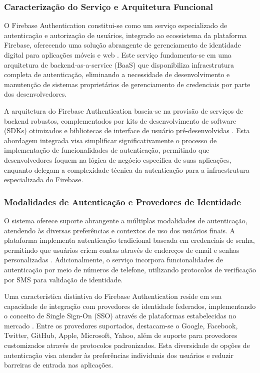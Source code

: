 \subsubsection{Caracterização do Serviço e Arquitetura Funcional}

O Firebase Authentication constitui-se como um serviço especializado de autenticação e autorização de usuários, integrado ao ecossistema da plataforma Firebase, oferecendo uma solução abrangente de gerenciamento de identidade digital para aplicações móveis e web \cite{google2023firebaseauth}. Este serviço fundamenta-se em uma arquitetura de backend-as-a-service (BaaS) que disponibiliza infraestrutura completa de autenticação, eliminando a necessidade de desenvolvimento e manutenção de sistemas proprietários de gerenciamento de credenciais por parte dos desenvolvedores.

A arquitetura do Firebase Authentication baseia-se na provisão de serviços de backend robustos, complementados por kits de desenvolvimento de software (SDKs) otimizados e bibliotecas de interface de usuário pré-desenvolvidas \cite{firebase2023sdk}. Esta abordagem integrada visa simplificar significativamente o processo de implementação de funcionalidades de autenticação, permitindo que desenvolvedores foquem na lógica de negócio específica de suas aplicações, enquanto delegam a complexidade técnica da autenticação para a infraestrutura especializada do Firebase.

\subsubsection{Modalidades de Autenticação e Provedores de Identidade}

O sistema oferece suporte abrangente a múltiplas modalidades de autenticação, atendendo às diversas preferências e contextos de uso dos usuários finais. A plataforma implementa autenticação tradicional baseada em credenciais de senha, permitindo que usuários criem contas através de endereços de email e senhas personalizadas \cite{stallings2023cryptography}. Adicionalmente, o serviço incorpora funcionalidades de autenticação por meio de números de telefone, utilizando protocolos de verificação por SMS para validação de identidade.

Uma característica distintiva do Firebase Authentication reside em sua capacidade de integração com provedores de identidade federados, implementando o conceito de Single Sign-On (SSO) através de plataformas estabelecidas no mercado \cite{jones2022federated}. Entre os provedores suportados, destacam-se o Google, Facebook, Twitter, GitHub, Apple, Microsoft, Yahoo, além de suporte para provedores customizados através de protocolos padronizados. Esta diversidade de opções de autenticação visa atender às preferências individuais dos usuários e reduzir barreiras de entrada nas aplicações.

